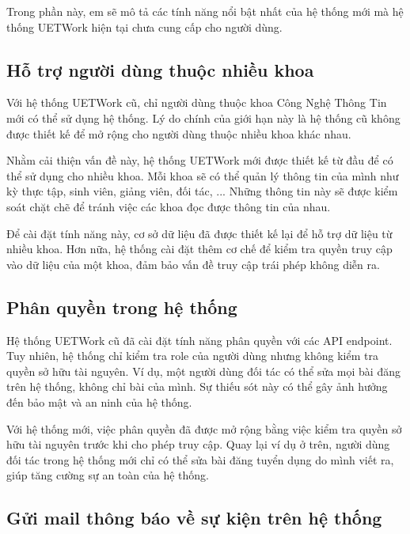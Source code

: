 \documentclass[./../main.tex]{subfiles}
\begin{document}
Trong phần này, em sẽ mô tả các tính năng nổi bật nhất của hệ thống mới
mà hệ thống UETWork hiện tại chưa cung cấp cho người dùng.

\hypertarget{hux1ed7-trux1ee3-ngux1b0ux1eddi-duxf9ng-thuux1ed9c-nhiux1ec1u-khoa}{%
	\subsection{Hỗ trợ người dùng thuộc nhiều
		khoa}\label{hux1ed7-trux1ee3-ngux1b0ux1eddi-duxf9ng-thuux1ed9c-nhiux1ec1u-khoa}}

Với hệ thống UETWork cũ, chỉ người dùng thuộc khoa Công Nghệ Thông Tin mới có thể sử dụng hệ thống. Lý do chính của giới hạn này là hệ thống cũ không được thiết kế để mở rộng cho người dùng thuộc nhiều khoa khác nhau.

Nhằm cải thiện vấn đề này, hệ thống UETWork mới được thiết kế từ đầu để có thể sử dụng cho nhiều khoa. Mỗi khoa sẽ có thể quản lý thông tin của mình như kỳ thực tập, sinh viên, giảng viên, đối tác, ... Những thông tin này sẽ được kiểm soát chặt chẽ để tránh việc các khoa đọc được thông tin của nhau.

Để cài đặt tính năng này, cơ sở dữ liệu đã được thiết kế lại để hỗ trợ dữ liệu từ nhiều khoa. Hơn nữa, hệ thống cài đặt thêm cơ chế để kiểm tra quyền truy cập vào dữ liệu của một khoa, đảm bảo vấn đề truy cập trái phép không diễn ra.

\hypertarget{phuxe2n-quyux1ec1n-trong-hux1ec7-thux1ed1ng}{%
	\subsection{Phân quyền trong hệ
		thống}\label{phuxe2n-quyux1ec1n-trong-hux1ec7-thux1ed1ng}}

Hệ thống UETWork cũ đã cài đặt tính năng phân quyền với các API endpoint. Tuy nhiên, hệ thống chỉ kiểm tra role của người dùng nhưng không kiểm tra quyền sở hữu tài nguyên. Ví dụ, một người dùng đối tác có thể sửa mọi bài đăng trên hệ thống, không chỉ bài của mình. Sự thiếu sót này có thể gây ảnh hưởng đến bảo mật và an ninh của hệ thống.

Với hệ thống mới, việc phân quyền đã được mở rộng bằng việc kiểm tra quyền sở hữu tài nguyên trước khi cho phép truy cập. Quay lại ví dụ ở trên, người dùng đối tác trong hệ thống mới chỉ có thể sửa bài đăng tuyển dụng do mình viết ra, giúp tăng cường sự an toàn của hệ thống.

\hypertarget{gux1eedi-mail-thuxf4ng-buxe1o-vux1ec1-sux1ef1-kiux1ec7n-truxean-hux1ec7-thux1ed1ng}{%
	\subsection{Gửi mail thông báo về sự kiện trên hệ
		thống}\label{gux1eedi-mail-thuxf4ng-buxe1o-vux1ec1-sux1ef1-kiux1ec7n-truxean-hux1ec7-thux1ed1ng}}
\end{document}
